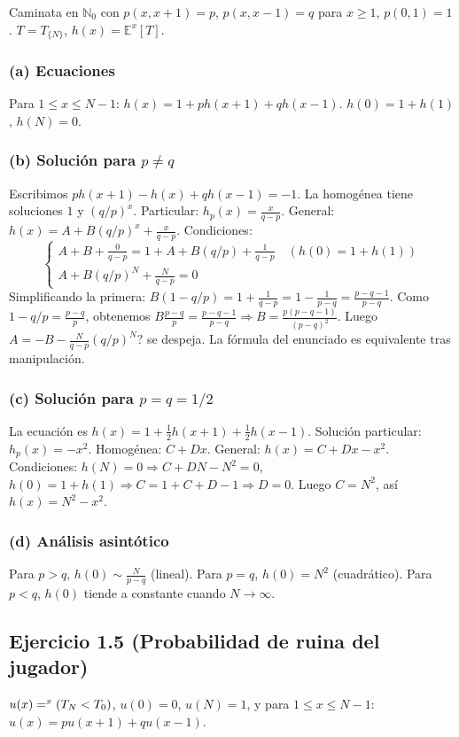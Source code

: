 \documentclass[12pt]{article}
\let\P\relax
\newcommand{\P}{\mathbb{P}}
\newcommand{\E}{\mathbb{E}}
\newcommand{\N}{\mathbb{N}}
\newcommand{\1}{\mathbf{1}}
\begin{document}
Caminata en $\N_0$ con $p(x,x+1)=p$, $p(x,x-1)=q$ para $x\ge1$, $p(0,1)=1$. $T=T_{\{N\}}$, $h(x)=\E^x[T]$.

\subsubsection*{(a) Ecuaciones}
Para $1\le x\le N-1$: $h(x)=1+ph(x+1)+qh(x-1)$. $h(0)=1+h(1)$, $h(N)=0$.

\subsubsection*{(b) Soluci\'on para $p\neq q$}
Escribimos $ph(x+1)-h(x)+qh(x-1)=-1$. La homog\'enea tiene soluciones $1$ y $(q/p)^x$. Particular: $h_p(x)=\frac{x}{q-p}$. General: $h(x)=A+B(q/p)^x+\frac{x}{q-p}$. Condiciones:
\[
\begin{cases}
A+B+\frac{0}{q-p}=1+A+B(q/p)+\frac{1}{q-p}\quad (h(0)=1+h(1))\\
A+B(q/p)^N+\frac{N}{q-p}=0
\end{cases}
\]
Simplificando la primera: $B(1-q/p)=1+\frac1{q-p}=1-\frac1{p-q}=\frac{p-q-1}{p-q}$. Como $1-q/p=\frac{p-q}{p}$, obtenemos $B\frac{p-q}{p}=\frac{p-q-1}{p-q}\Rightarrow B=\frac{p(p-q-1)}{(p-q)^2}$. Luego $A=-B-\frac{N}{q-p}(q/p)^N?$ se despeja. La fórmula del enunciado es equivalente tras manipulación.

\subsubsection*{(c) Soluci\'on para $p=q=1/2$}
La ecuaci\'on es $h(x)=1+\frac12h(x+1)+\frac12h(x-1)$. Soluci\'on particular: $h_p(x)=-x^2$. Homog\'enea: $C+Dx$. General: $h(x)=C+Dx-x^2$. Condiciones:
$h(N)=0\Rightarrow C+DN-N^2=0$, $h(0)=1+h(1)\Rightarrow C=1+C+D-1\Rightarrow D=0$. Luego $C=N^2$, así $h(x)=N^2-x^2$.

\subsubsection*{(d) An\'alisis asint\'otico}
Para $p>q$, $h(0)\sim\frac{N}{p-q}$ (lineal). Para $p=q$, $h(0)=N^2$ (cuadr\'atico). Para $p<q$, $h(0)$ tiende a constante cuando $N\to\infty$.

\subsection{Ejercicio 1.5 (Probabilidad de ruina del jugador)}

$u(x)=\P^x(T_N<T_0)$, $u(0)=0$, $u(N)=1$, y para $1\le x\le N-1$: $u(x)=pu(x+1)+qu(x-1)$.
\end{document}
